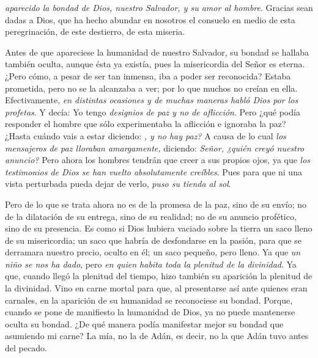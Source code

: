 \begin{body}
	 \emph{aparecido la bondad de Dios, nuestro Salvador, y su amor al hombre}. Gracias sean dadas a Dios, que ha hecho abundar en nosotros el consuelo en medio de esta peregrinación, de este destierro, de esta miseria.
	
	Antes de que apareciese la humanidad de nuestro Salvador, su bondad se hallaba también oculta, aunque ésta ya existía, pues la misericordia del Señor es eterna. ¿Pero cómo, a pesar de ser tan inmensa, iba a poder ser reconocida? Estaba prometida, pero no se la alcanzaba a ver; por lo que muchos no creían en ella. Efectivamente, \emph{en distintas ocasiones y de muchas maneras habló Dios por los profetas}. Y decía: Yo tengo \emph{designios de paz y no de aflicción}. Pero ¿qué podía responder el hombre que sólo experimentaba la aflicción e ignoraba la paz? ¿Hasta cuándo vais a estar diciendo: \emph{, y no hay paz?} A causa de lo cual \emph{los mensajeros de paz lloraban amargamente,} diciendo: \emph{Señor, ¿quién creyó nuestro anuncio?} Pero ahora los hombres tendrán que creer a sus propios ojos, ya que \emph{los testimonios de Dios se han vuelto absolutamente creíbles}. Pues para que ni una vista perturbada pueda dejar de verlo, \emph{puso su tienda al sol}.
	
	Pero de lo que se trata ahora no es de la promesa de la paz, sino de su envío; no de la dilatación de su entrega, sino de su realidad; no de su anuncio profético, sino de su presencia. Es como si Dios hubiera vaciado sobre la tierra un saco lleno de su misericordia; un saco que habría de desfondarse en la pasión, para que se derramara nuestro precio, oculto en él; un saco pequeño, pero lleno. Ya que \emph{un niño se nos ha dado}, pero \emph{en quien habita toda la plenitud de la divinidad}. Ya que, cuando llegó la plenitud del tiempo, hizo también su aparición la plenitud de la divinidad. Vino en carne mortal para que, al presentarse así ante quienes eran carnales, en la aparición de su humanidad se reconociese su bondad. Porque, cuando se pone de manifiesto la humanidad de Dios, ya no puede mantenerse oculta su bondad. ¿De qué manera podía manifestar mejor su bondad que asumiendo mi carne? La mía, no la de Adán, es decir, no la que Adán tuvo antes del pecado.
	

\end{body}
